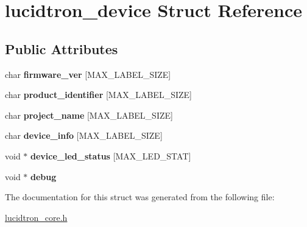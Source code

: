 \hypertarget{structlucidtron__device}{}\section{lucidtron\+\_\+device Struct Reference}
\label{structlucidtron__device}
\subsection*{Public Attributes}
\begin{DoxyCompactItemize}
\item 
char {\bfseries firmware\+\_\+ver} \mbox{[}M\+A\+X\+\_\+\+L\+A\+B\+E\+L\+\_\+\+S\+I\+ZE\mbox{]}\hypertarget{structlucidtron__device_aa5de46c1a06e0c29ee54747c49bf10b8}{}\label{structlucidtron__device_aa5de46c1a06e0c29ee54747c49bf10b8}

\item 
char {\bfseries product\+\_\+identifier} \mbox{[}M\+A\+X\+\_\+\+L\+A\+B\+E\+L\+\_\+\+S\+I\+ZE\mbox{]}\hypertarget{structlucidtron__device_a6103c5301f3c3d2e336c826047448ba7}{}\label{structlucidtron__device_a6103c5301f3c3d2e336c826047448ba7}

\item 
char {\bfseries project\+\_\+name} \mbox{[}M\+A\+X\+\_\+\+L\+A\+B\+E\+L\+\_\+\+S\+I\+ZE\mbox{]}\hypertarget{structlucidtron__device_a36b3bceddcbe4c913c5b52e38ee6080e}{}\label{structlucidtron__device_a36b3bceddcbe4c913c5b52e38ee6080e}

\item 
char {\bfseries device\+\_\+info} \mbox{[}M\+A\+X\+\_\+\+L\+A\+B\+E\+L\+\_\+\+S\+I\+ZE\mbox{]}\hypertarget{structlucidtron__device_a46c7202dd381523b30e94dedd9c17c74}{}\label{structlucidtron__device_a46c7202dd381523b30e94dedd9c17c74}

\item 
void $\ast$ {\bfseries device\+\_\+led\+\_\+status} \mbox{[}M\+A\+X\+\_\+\+L\+E\+D\+\_\+\+S\+T\+AT\mbox{]}\hypertarget{structlucidtron__device_a6225703eefdeba5a46f4f8744a1a1399}{}\label{structlucidtron__device_a6225703eefdeba5a46f4f8744a1a1399}

\item 
void $\ast$ {\bfseries debug}\hypertarget{structlucidtron__device_a9dc787d7f5d0beedfc6942e498c1d359}{}\label{structlucidtron__device_a9dc787d7f5d0beedfc6942e498c1d359}

\end{DoxyCompactItemize}


The documentation for this struct was generated from the following file\+:\begin{DoxyCompactItemize}
\item 
\hyperlink{lucidtron__core_8h}{lucidtron\+\_\+core.\+h}\end{DoxyCompactItemize}
